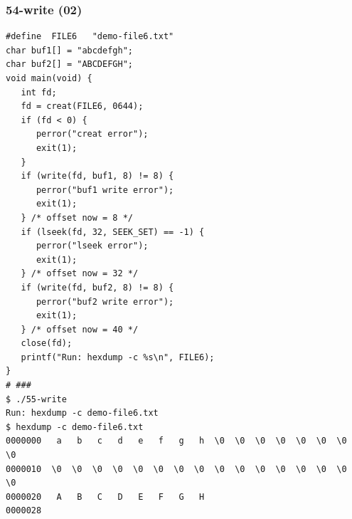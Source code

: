 \documentclass[xcolor=table, notheorems, hyperref={pdfpagelabels=false}]{beamer}
\begin{document}
\begin{frame}[fragile]
\frametitle{54-write (02)}
\begin{lstlisting}[basicstyle=\ttfamily\tiny]
#define  FILE6   "demo-file6.txt"
char buf1[] = "abcdefgh";
char buf2[] = "ABCDEFGH";
void main(void) {
   int fd;
   fd = creat(FILE6, 0644);
   if (fd < 0) {
      perror("creat error");
      exit(1);
   }
   if (write(fd, buf1, 8) != 8) {
      perror("buf1 write error");
      exit(1);
   } /* offset now = 8 */
   if (lseek(fd, 32, SEEK_SET) == -1) {
      perror("lseek error");
      exit(1);
   } /* offset now = 32 */
   if (write(fd, buf2, 8) != 8) {
      perror("buf2 write error");
      exit(1);
   } /* offset now = 40 */
   close(fd);
   printf("Run: hexdump -c %s\n", FILE6);
}
# ###
$ ./55-write 
Run: hexdump -c demo-file6.txt
$ hexdump -c demo-file6.txt 
0000000   a   b   c   d   e   f   g   h  \0  \0  \0  \0  \0  \0  \0  \0
0000010  \0  \0  \0  \0  \0  \0  \0  \0  \0  \0  \0  \0  \0  \0  \0  \0
0000020   A   B   C   D   E   F   G   H                                
0000028
\end{lstlisting}
\end{frame}

\end{document}
